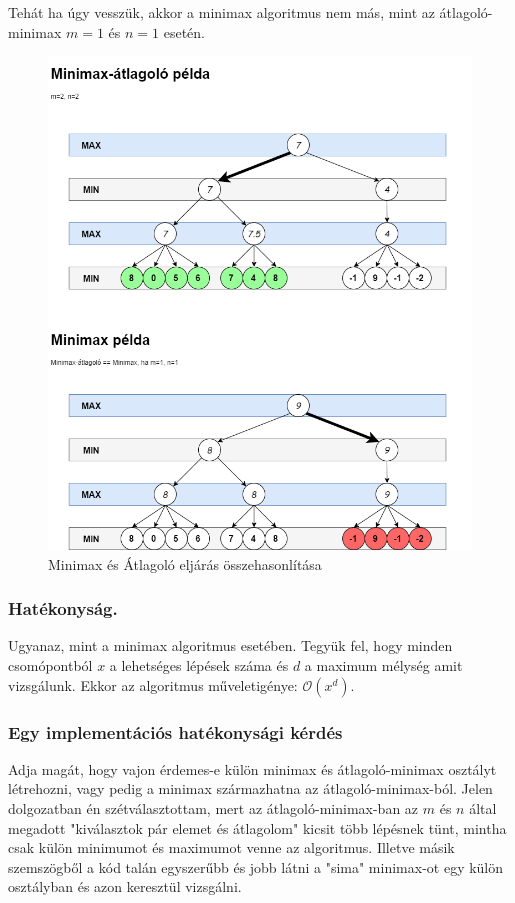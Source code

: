 \documentclass[twoside, a4paper, 12pt]{book}
\begin{document}
Tehát ha úgy vesszük, akkor a minimax algoritmus nem más, mint az átlagoló-minimax $m=1$ és $n=1$ esetén.

\begin{figure}[htbp]
	\centering
	\includegraphics[width=\textwidth]{img/minimaxVsAverageExample.png}
	\caption{Minimax és Átlagoló eljárás összehasonlítása\cite{bevMiHu}}
	\label{fig:minimaxVsAverageExample}
\end{figure}
\subsubsection*{Hatékonyság.} Ugyanaz, mint a minimax algoritmus esetében. Tegyük fel, hogy minden csomópontból $x$ a lehetséges lépések száma és $d$ a maximum mélység amit vizsgálunk. Ekkor az algoritmus műveletigénye: $ \mathcal{O}(x^d)$.\cite{alfaBetaPruneHu}

\subsubsection*{Egy implementációs hatékonysági kérdés}
Adja magát, hogy vajon érdemes-e külön minimax és átlagoló-minimax osztályt létrehozni, vagy pedig a minimax származhatna az átlagoló-minimax-ból. Jelen dolgozatban én szétválasztottam, mert az átlagoló-minimax-ban az $m$ és $n$ által megadott "kiválasztok pár elemet és átlagolom" kicsit több lépésnek tünt, mintha csak külön minimumot és maximumot venne az algoritmus. Illetve másik szemszögből a kód talán egyszerűbb és jobb látni a "sima" minimax-ot egy külön osztályban és azon keresztül vizsgálni.
\end{document}
